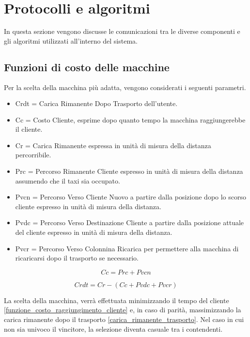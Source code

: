 \section{Protocolli e algoritmi}
In questa sezione vengono discusse le comunicazioni tra le diverse componenti e gli algoritmi utilizzati all'interno del sistema.

\subsection{Funzioni di costo delle macchine} \label{funzioni_di_costo_macchine}
Per la scelta della macchina più adatta, vengono considerati i seguenti parametri.

\begin{itemize}
	\item Crdt = Carica Rimanente Dopo Trasporto dell'utente.
	\item Cc = Costo Cliente, esprime dopo quanto tempo la macchina raggiungerebbe il cliente.
	\item Cr = Carica Rimanente espressa in unità di misura della distanza percorribile.
	\item Prc = Percorso Rimanente Cliente espresso in unità di misura della distanza assumendo che il taxi sia occupato.
	\item Pvcn = Percorso Verso Cliente Nuovo a partire dalla posizione dopo lo scorso cliente espresso in unità di misura della distanza.
	\item Pvdc = Percorso Verso Destinazione Cliente a partire dalla posizione attuale del cliente espresso in unità di misura della distanza.
	\item Pvcr = Percorso Verso Colonnina Ricarica per permettere alla macchina di ricaricarsi dopo il trasporto se necessario.
\end{itemize}

\begin{equation} \label{funzione_costo_raggiungimento_cliente}
Cc = Prc + Pvcn
\end{equation}

\begin{equation} \label{carica_rimanente_trasporto}
Crdt = Cr - (Cc + Pvdc + Pvcr)
\end{equation}

La scelta della macchina, verrà effettuata minimizzando il tempo del cliente \ref{funzione_costo_raggiungimento_cliente} e, in caso di parità, massimizzando la carica rimanente dopo il trasporto \ref{carica_rimanente_trasporto}. Nel caso in cui non sia univoco il vincitore, la selezione diventa casuale tra i contendenti.

